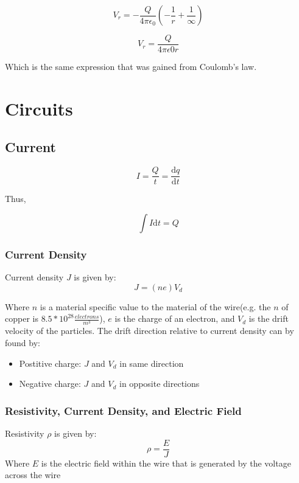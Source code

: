 \documentclass[a4paper,12pt]{article}
\begin{document}
						\begin{equation*}
								V_{r} = -\frac{Q}{4\pi \epsilon_{0}} \left(-\frac{1}{r} + \frac{1}{\infty}\right)
						\end{equation*}

						\begin{equation*}
								V_{r} = \frac{Q}{4\pi \epsilon{0} r}
						\end{equation*}

						Which is the same expression that was gained from Coulomb's law.
		\section{Circuits}
			\subsection{Current}
				\begin{equation*}
						I = \frac{Q}{t} = \frac{\mathrm{d}q}{\mathrm{d}t}
				\end{equation*}

				Thus,

				\begin{equation*}
						\int I \mathrm{d}t = Q
				\end{equation*}

				\subsubsection{Current Density}
					Current density $J$ is given by:
					\begin{equation*}
							J = \left(ne\right) V_{d}
					\end{equation*}

					Where $n$ is a material specific value to the material of the wire(e.g. the $n$ of copper is $8.5 * 10^{28} \frac{electrons}{m^{3}}$), $e$ is the charge of an electron, and $V_{d}$ is the drift velocity of the particles. The drift direction relative to current density can by found by:
					\begin{itemize}
							\item Postitive charge: $J$ and $V_{d}$ in same direction
							\item Negative charge: $J$ and $V_{d}$ in opposite directions
					\end{itemize}

				\subsubsection{Resistivity, Current Density, and Electric Field}
					Resistivity $\rho$ is given by:
					\begin{equation*}
							\rho = \frac{E}{J}
					\end{equation*}
					Where $E$ is the electric field within the wire that is generated by the voltage across the wire
\end{document}
